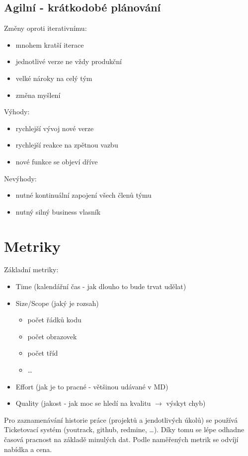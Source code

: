 \documentclass{szzclass}
\begin{document}
\subsection{Agilní - krátkodobé plánování}
Změny oproti iterativnímu:
\begin{itemize}
    \item mnohem kratší iterace
    \item jednotlivé verze ne vždy produkční
    \item velké nároky na celý tým
    \item změna myšlení
\end{itemize}
Výhody:
\begin{itemize}
    \item rychlejší vývoj nové verze
    \item rychlejší reakce na zpětnou vazbu
    \item nové funkce se objeví dříve
\end{itemize}
Nevýhody:
\begin{itemize}
    \item nutné kontinuální zapojení všech členů týmu
    \item nutný silný business vlasník
\end{itemize}
\section{Metriky}
Základní metriky:
\begin{itemize}
    \item Time (kalendářní čas - jak dlouho to bude trvat udělat)
    \item Size/Scope (jaký je rozsah)
    \begin{itemize}
        \item počet řádků kodu
        \item počet obrazovek
        \item počet tříd
        \item \dots
    \end{itemize}
    \item Effort (jak je to pracné - většinou udávané v MD)
    \item Quality (jakost - jak moc se hledí na kvalitu $\rightarrow$ výskyt chyb)
\end{itemize}
Pro zaznamenávání historie práce (projektů a jendotlivých úkolů) se používá Ticketovací systém (youtrack, github, redmine, \dots).
Díky tomu se lépe odhadne časová pracnost na základě minulých dat. Podle naměřených metrik se odvíjí nabídka a cena.
\end{document}
